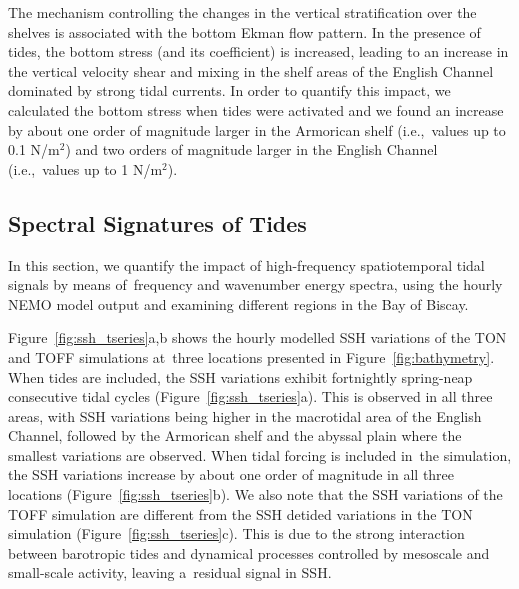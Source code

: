 \documentclass[jmse,article,accept,moreauthors,pdftex]{Definitions/mdpi}
\begin{document}
The mechanism controlling the changes in the vertical stratification over the shelves is associated with the bottom Ekman flow pattern. In the presence of tides, the bottom stress (and its coefficient) is increased, leading to an increase in the vertical velocity shear and mixing in the shelf areas of the English Channel dominated by strong tidal currents. In order to quantify this impact, we calculated the bottom stress when tides were activated and we found an increase by about one order of magnitude larger in the Armorican shelf (i.e.,~values up to 0.1 N/m$^2$) and two orders of magnitude larger in the English Channel (i.e.,~values up to 1 N/m$^2$).
 
\subsection{Spectral Signatures of Tides}
\label{section:3.4}

In this section, we quantify the impact of high-frequency spatiotemporal tidal signals by means of~frequency and wavenumber energy spectra, using the hourly NEMO model output and examining different regions in the Bay of Biscay.

Figure~\ref{fig:ssh_tseries}a,b shows the hourly modelled SSH variations of the TON and TOFF simulations at~three locations presented in Figure~\ref{fig:bathymetry}. When tides are included, the SSH variations exhibit fortnightly spring-neap consecutive tidal cycles (Figure~\ref{fig:ssh_tseries}a). This is observed in all three areas, with SSH variations being higher in the macrotidal area of the English Channel, followed by the Armorican shelf and the abyssal plain where the smallest variations are observed. When tidal forcing is included in~the simulation, the SSH variations increase by about one order of magnitude in all three locations (Figure~\ref{fig:ssh_tseries}b). We also note that the SSH variations of the TOFF simulation are different from the SSH detided variations in the TON simulation (Figure~\ref{fig:ssh_tseries}c). This is due to the strong interaction between barotropic tides and dynamical processes controlled by mesoscale and small-scale activity, leaving a~residual signal in SSH.
\end{document}
